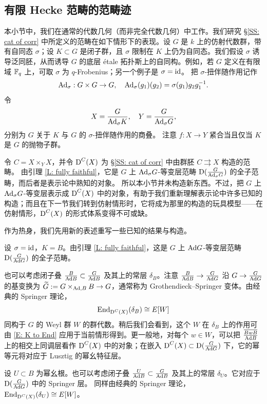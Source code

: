 \subsection{有限 Hecke 范畴的范畴迹}

本小节中，我们在通常的代数几何（而非完全代数几何）中工作。我们研究 \S \ref{SS: cat of corr} 中所定义的范畴在如下情形下的表现。设 $G$ 是 $k$ 上的仿射代数群，带有自同态 $\sigma$；设 $K\subset G$ 是闭子群，且 $\sigma$ 限制在 $K$ 上仍为自同态。我们假设 $\sigma$ 诱导泛同胚，从而诱导 $G$ 的底层 \'etale 拓扑斯上的自同构。例如，若 $G$ 定义在有限域 ${\mathbb F}_q$ 上，可取 $\sigma$ 为 $q$-Frobenius；另一个例子是 $\sigma={\operatorname{id}}$。
把 $\sigma$-扭伴随作用记作
\[{\operatorname{Ad}}_\sigma: G\times G\to G,\quad {\operatorname{Ad}}_\sigma(g_1)(g_2)=\sigma(g_1)g_2 g_1^{-1}.\]
令
$$X=\frac{G}{{\operatorname{Ad}}_\sigma K},\quad Y=\frac{G}{{\operatorname{Ad}}_\sigma G},$$
分别为 $G$ 关于 $K$ 与 $G$ 的 $\sigma$-扭伴随作用的商叠。
注意 $f: X\to Y$ 紧合当且仅当 $K$ 是 $G$ 的抛物子群。

令 $C=X\times_YX$，并令 $\operatorname{D}^{C}(X)$ 为 \S \ref{SS: cat of corr} 中由群胚 $C\rightrightarrows X$ 构造的范畴。
由引理 \ref{L: fully faithful}，它是 $G$ 上 ${\operatorname{Ad}}_\sigma G$-等变层范畴 $\operatorname{D}(\frac{G}{{\operatorname{Ad}}_\sigma G})$ 的全子范畴，而后者是表示论中熟知的对象。
所以本小节并未构造新东西。不过，把 $G$ 上 ${\operatorname{Ad}}_\sigma G$-等变层表示成 $\operatorname{D}^{C}(X)$ 中的对象，有助于我们重新理解表示论中许多已知的构造；而且在下一节我们转到仿射情形时，它将成为那里的构造的玩具模型——在仿射情形，$\operatorname{D}^{C}(X)$ 的形式体系变得不可或缺。

作为热身，我们先用新的表述重写一些已知的结果与构造。

\begin{ex}
\label{Ex:springer}
设 $\sigma={\operatorname{id}}$，$K=B$。由引理 \ref{L: fully faithful}，这是 $G$ 上 ${\operatorname{Ad}} G$-等变层范畴 $\operatorname{D}(\frac{G}{{\operatorname{Ad}} G})$ 的全子范畴。

也可以考虑闭子叠 $\frac{B}{{\operatorname{Ad}} B}\subset \frac{G}{{\operatorname{Ad}} B}$ 及其上的常层 $\delta_{B}$。注意 $\frac{B}{{\operatorname{Ad}} B}\to \frac{G}{{\operatorname{Ad}} G}$ 沿 $G\to \frac{G}{{\operatorname{Ad}} G}$ 的基变换为
$\widetilde G:=G\times_{{\operatorname{Ad}},B}B\to G$，通常称为 Grothendieck–Springer 变体。由经典的 Springer 理论，
$${\operatorname{End}}_{\operatorname{D}^{C}(X)}(\delta_{B})\cong E[W]$$
同构于 $G$ 的 Weyl 群 $W$ 的群代数。稍后我们会看到，这个 $W$ 在 $\delta_{B}$ 上的作用可由 \eqref{E: K to End} 应用于当前情形得到。更一般地，对每个 $w\in W$，可以把 $\frac{\overline{BwB}}{{\operatorname{Ad}} B}$ 上的相交上同调层看作 $\operatorname{D}^{C}(X)$ 中的对象；在嵌入 $\operatorname{D}^{C}(X)\subset \operatorname{D}(\frac{G}{{\operatorname{Ad}} G})$ 下，它的幂等元将对应于 Lusztig 的幂幺特征层。

设 $U\subset B$ 为幂幺根。也可以考虑闭子叠 $\frac{U}{{\operatorname{Ad}} B}\subset \frac{G}{{\operatorname{Ad}} B}$ 及其上的常层 $\delta_{U}$。它对应于 $\operatorname{D}(\frac{G}{{\operatorname{Ad}} G})$ 中的 Springer 层。
同样由经典的 Springer 理论，
${\operatorname{End}}_{\operatorname{D}^C(X)}(\delta_{U})\cong E[W]$。
\end{ex}

